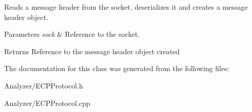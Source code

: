 Reads a message header from the socket, deserializes it and creates a message header object. 


\begin{DoxyParams}{Parameters}
{\em sock} & Reference to the socket.\\
\hline
\end{DoxyParams}
\begin{DoxyReturn}{Returns}
Reference to the message header object created 
\end{DoxyReturn}


The documentation for this class was generated from the following files\-:\begin{DoxyCompactItemize}
\item 
Analyzer/E\-C\-P\-Protocol.\-h\item 
Analyzer/E\-C\-P\-Protocol.\-cpp\end{DoxyCompactItemize}
